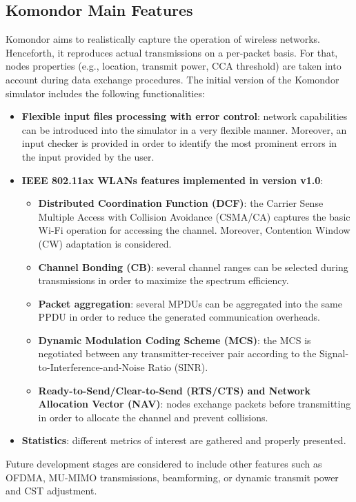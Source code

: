 \documentclass[a4paper]{article}
\begin{document}
\subsection{Komondor Main Features}
\label{section:features}
Komondor aims to realistically capture the operation of wireless networks. Henceforth, it reproduces actual transmissions on a per-packet basis. For that, nodes properties (e.g., location, transmit power, CCA threshold) are taken into account during data exchange procedures. The initial version of the Komondor simulator includes the following functionalities:
\begin{itemize}
	\item \textbf{Flexible input files processing with error control}: network capabilities can be introduced into the simulator in a very flexible manner. Moreover, an input checker is provided in order to identify the most prominent errors in the input provided by the user.
	\item \textbf{IEEE 802.11ax WLANs features implemented in version v1.0}:
	\begin{itemize}
		\item \textbf{Distributed Coordination Function (DCF)}: the Carrier Sense Multiple Access with Collision Avoidance (CSMA/CA) captures the basic Wi-Fi operation for accessing the channel. Moreover, Contention Window (CW) adaptation is considered.
		\item \textbf{Channel Bonding (CB)}: several channel ranges can be selected during transmissions in order to maximize the spectrum efficiency.
		\item \textbf{Packet aggregation}: several MPDUs can be aggregated into the same PPDU in order to reduce the generated communication overheads.
		\item\textbf{ Dynamic Modulation Coding Scheme (MCS)}: the MCS is negotiated between any transmitter-receiver pair according to the Signal-to-Interference-and-Noise Ratio (SINR).
		\item \textbf{Ready-to-Send/Clear-to-Send (RTS/CTS) and Network Allocation Vector (NAV)}: nodes exchange packets before transmitting in order to allocate the channel and prevent collisions.
	\end{itemize}
	\item \textbf{Statistics}: different metrics of interest are gathered and properly presented.
\end{itemize}

Future development stages are considered to include other features such as OFDMA, MU-MIMO transmissions, beamforming, or dynamic transmit power and CST adjustment.
	
\end{document}

